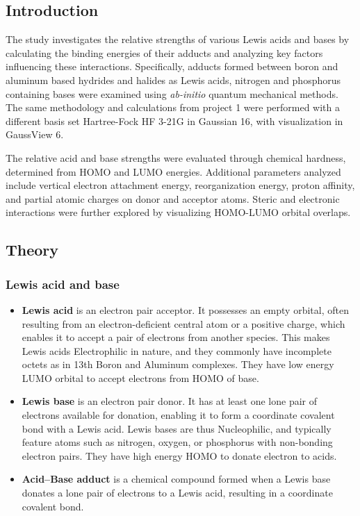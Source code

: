 \subsection{Introduction}
The study investigates the relative strengths of various Lewis acids and bases by calculating the binding energies of their adducts and analyzing key factors influencing these interactions. Specifically, adducts formed between boron and aluminum based hydrides and halides as Lewis acids, nitrogen and phosphorus containing bases were examined using \textit{ab-initio} quantum mechanical methods. The same methodology and calculations from project 1 were performed with a different basis set Hartree-Fock HF 3-21G in Gaussian 16, with visualization in GaussView 6.

The relative acid and base strengths were evaluated through chemical hardness, determined from HOMO and LUMO energies. Additional parameters analyzed include vertical electron attachment energy, reorganization energy, proton affinity, and partial atomic charges on donor and acceptor atoms. Steric and electronic interactions were further explored by visualizing HOMO-LUMO orbital overlaps.

\subsection{Theory}
\subsubsection{Lewis acid and base}
\begin{itemize}
    \item \textbf{Lewis acid} is an electron pair acceptor. It possesses an empty orbital, often resulting from an electron-deficient central atom or a positive charge, which enables it to accept a pair of electrons from another species. This makes Lewis acids Electrophilic in nature, and they commonly have incomplete octets as in 13th Boron and Aluminum complexes. They have low energy LUMO orbital to accept electrons from HOMO of base.
    \item \textbf{Lewis base} is an electron pair donor. It has at least one lone pair of electrons available for donation, enabling it to form a coordinate covalent bond with a Lewis acid. Lewis bases are thus Nucleophilic, and typically feature atoms such as nitrogen, oxygen, or phosphorus with non-bonding electron pairs. They have high energy HOMO to donate electron to acids.
    \item \textbf{Acid–Base adduct} is a chemical compound formed when a Lewis base donates a lone pair of electrons to a Lewis acid, resulting in a coordinate covalent bond.
\end{itemize}

